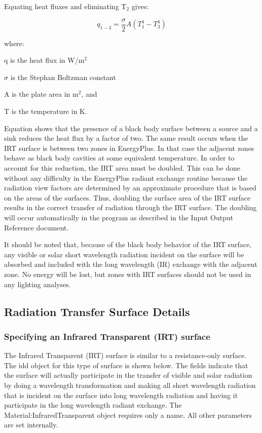 Equating heat fluxes and eliminating T\(_{2}\) gives:

\begin{equation}
{q_{1 - 3}} = \frac{\sigma }{2}A\left( {T_1^4 - T_3^4} \right)
\end{equation}

where:

q is the heat flux in W/m\(^{2}\)

$\sigma$ is the Stephan Boltzman constant

A is the plate area in m\(^{2}\), and

T is the temperature in K.

Equation shows that the presence of a black body surface between a source and a sink reduces the heat flux by a factor of two. The same result occurs when the IRT surface is between two zones in EnergyPlus. In that case the adjacent zones behave as black body cavities at some equivalent temperature. In order to account for this reduction, the IRT area must be doubled. This can be done without any difficulty in the EnergyPlus radiant exchange routine because the radiation view factors are determined by an approximate procedure that is based on the areas of the surfaces. Thus, doubling the surface area of the IRT surface results in the correct transfer of radiation through the IRT surface. The doubling will occur automatically in the program as described in the Input Output Reference document.

It should be noted that, because of the black body behavior of the IRT surface, any visible or solar short wavelength radiation incident on the surface will be absorbed and included with the long wavelength (IR) exchange with the adjacent zone. No energy will be lost, but zones with IRT surfaces should not be used in any lighting analyses.

\subsection{Radiation Transfer Surface Details}\label{radiation-transfer-surface-details}

\subsubsection{Specifying an Infrared Transparent (IRT) surface}\label{specifying-an-infrared-transparent-irt-surface}

The Infrared Transparent (IRT) surface is similar to a resistance-only surface. The idd object for this type of surface is shown below. The fields indicate that the surface will actually participate in the transfer of visible and solar radiation by doing a wavelength transformation and making all short wavelength radiation that is incident on the surface into long wavelength radiation and having it participate in the long wavelength radiant exchange. The Material:InfraredTransparent object requires only a name. All other parameters are set internally.

